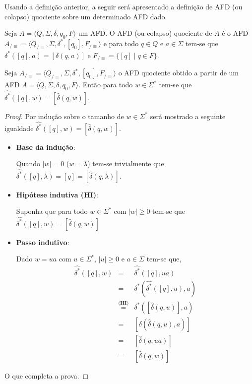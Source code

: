 Usando a definição anterior, a seguir será apresentado a definição de  AFD (ou colapso) quociente sobre um determinado AFD dado.

\begin{definition}\label{def:AFD-Quociente}
	Seja $A = \langle Q, \Sigma, \delta, q_0, F\rangle$ um AFD. O AFD (ou colapso) quociente de $A$ é o AFD $A_{/\equiv} = \langle Q_{/\equiv}, \Sigma, \delta^*, [q_0],  F_{/\equiv}\rangle$ e para todo $q \in Q$ e $a \in \Sigma$ tem-se que $\delta^*([q], a) = [\delta(q, a)]$ e  $F_{/\equiv} = \{[q] \mid q \in F\}$.
\end{definition}

\begin{theorem}\label{teo:ExtensaoDeltaEstrela}
	Seja  $A_{/\equiv} = \langle Q_{/\equiv}, \Sigma, \delta^*, [q_0],  F_{/\equiv}\rangle$ o AFD quociente obtido a partir de um AFD $A = \langle Q, \Sigma, \delta, q_0, F\rangle$. Então para todo $w \in \Sigma^*$ tem-se que $\widehat{\delta^*}([q], w) = [\widehat{\delta}(q, w)]$.
\end{theorem}

\begin{proof}
	Por indução sobre o tamanho de $w \in \Sigma^*$ será mostrado a seguinte igualdade $\widehat{\delta^*}([q], w) = [\widehat{\delta}(q, w)]$.
	\begin{itemize}
		\item \textbf{Base da indução}:
		
		Quando $|w| = 0$ ($w = \lambda$) tem-se trivialmente que $\widehat{\delta^*}([q], \lambda) = [q] = [\widehat{\delta}(q, \lambda)]$.
		
		\item \textbf{Hipótese indutiva (HI)}:
		
		Suponha que para todo $w \in \Sigma^*$ com $|w| \geq 0$ tem-se que $\widehat{\delta^*}([q], w) = [\widehat{\delta}(q, w)]$
		\item \textbf{Passo indutivo}:
		
		Dado $w = ua$ com $u \in \Sigma^*$, $|u| \geq 0$ e $a \in \Sigma$ tem-se que, 
		\begin{eqnarray*}
			\widehat{\delta^*}([q], w) & = & \widehat{\delta^*}([q], ua)\\
			& = & \delta^*(\widehat{\delta^*}([q], u),a)\\
			& \stackrel{\textbf{(HI)}}{=} & \delta^*([\widehat{\delta}(q, u)],a)\\
			& = & [\delta(\widehat{\delta}(q, u),a)]\\
			& = & [\widehat{\delta}(q, ua)]\\
			& = & [\widehat{\delta}(q, w)]
		\end{eqnarray*}
	\end{itemize}
	O que completa a prova.
\end{proof}

